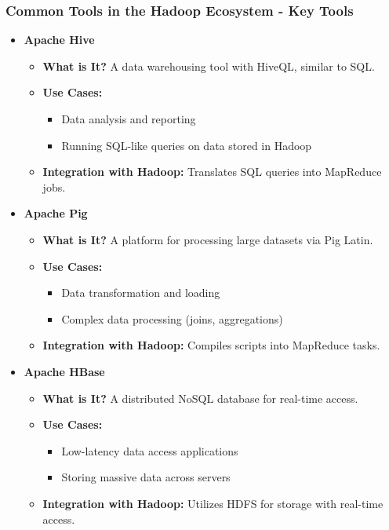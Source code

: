 \documentclass[aspectratio=169]{beamer}
\begin{document}
\begin{frame}[fragile]
    \frametitle{Common Tools in the Hadoop Ecosystem - Key Tools}
    \begin{itemize}
        \item \textbf{Apache Hive}
            \begin{itemize}
                \item \textbf{What is It?} A data warehousing tool with HiveQL, similar to SQL.
                \item \textbf{Use Cases:}
                    \begin{itemize}
                        \item Data analysis and reporting
                        \item Running SQL-like queries on data stored in Hadoop
                    \end{itemize}
                \item \textbf{Integration with Hadoop:} Translates SQL queries into MapReduce jobs.
            \end{itemize}
        
        \item \textbf{Apache Pig}
            \begin{itemize}
                \item \textbf{What is It?} A platform for processing large datasets via Pig Latin.
                \item \textbf{Use Cases:}
                    \begin{itemize}
                        \item Data transformation and loading
                        \item Complex data processing (joins, aggregations)
                    \end{itemize}
                \item \textbf{Integration with Hadoop:} Compiles scripts into MapReduce tasks.
            \end{itemize}
        
        \item \textbf{Apache HBase}
            \begin{itemize}
                \item \textbf{What is It?} A distributed NoSQL database for real-time access.
                \item \textbf{Use Cases:}
                    \begin{itemize}
                        \item Low-latency data access applications
                        \item Storing massive data across servers
                    \end{itemize}
                \item \textbf{Integration with Hadoop:} Utilizes HDFS for storage with real-time access.
            \end{itemize}
    \end{itemize}
\end{frame}
\end{document}
